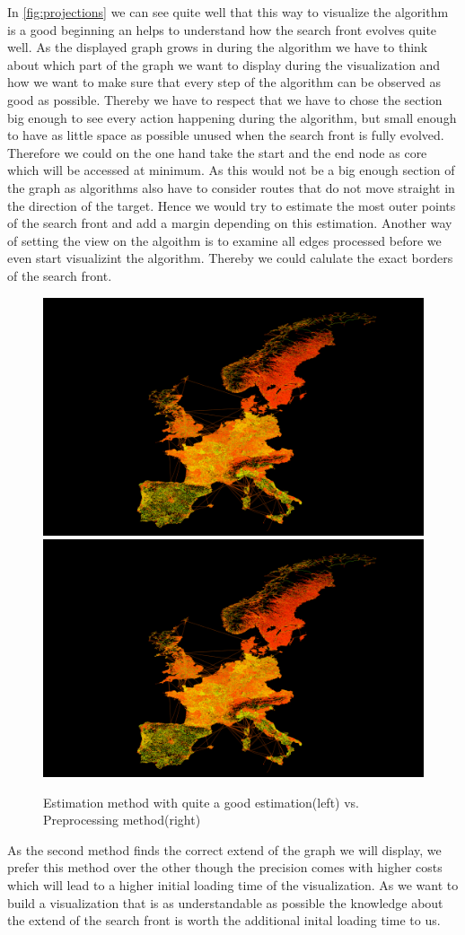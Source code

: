 \documentclass
[
	paper = a4,
    pagesize,
	12 pt,
	oneside,                       %
    open = right,
	DIV = calc,
	BCOR = 0 mm,                   %
	bibtotoc
]
{scrbook}
\begin{document}
In \cref{fig:projections} we can see quite well that this way to visualize the algorithm is a good beginning an helps to understand how the search front evolves quite well.
As the displayed graph grows in during the algorithm we have to think about which part of the graph we want to display during the visualization and how we want to make sure that every step of the algorithm can be observed as good as possible.
Thereby we have to respect that we have to chose the section big enough to see every action happening during the algorithm, but small enough to have as little space as possible unused when the search front is fully evolved.
Therefore we could on the one hand take the start and the end node as core which will be accessed at minimum.
As this would not be a big enough section of the graph as algorithms also have to consider routes that do not move straight in the direction of the target.
Hence we would try to estimate the most outer points of the search front and add a margin depending on this estimation.
Another way of setting the view on the algoithm is to examine all edges processed before we even start visualizint the algorithm.
Thereby we could calulate the exact borders of the search front.

\begin{figure}[H]
	\includegraphics[width=.5\textwidth]{Images/placeholder.png}
	\includegraphics[width=.5\textwidth]{Images/placeholder.png}
\caption[]{Estimation method with quite a good estimation(left) vs. Preprocessing method(right)}
\label{fig:sections}
\end{figure}

As the second method finds the correct extend of the graph we will display, we prefer this method over the other though the precision comes with higher costs which will lead to a higher initial loading time of the visualization.
As we want to build a visualization that is as understandable as possible the knowledge about the extend of the search front is worth the additional inital loading time to us.
\end{document}
